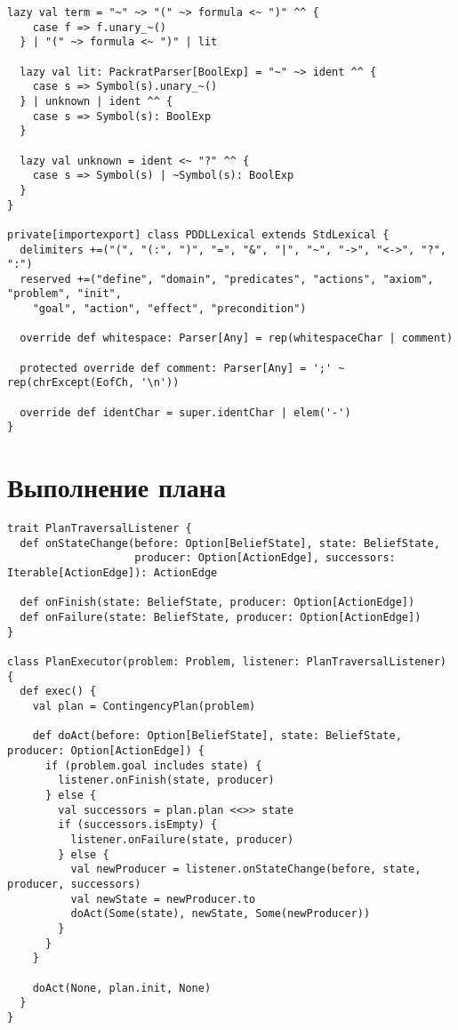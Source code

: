 \begin{lstlisting}[caption=PDDLParser, label=source_parser]
  lazy val term = "~" ~> "(" ~> formula <~ ")" ^^ {
    case f => f.unary_~()
  } | "(" ~> formula <~ ")" | lit

  lazy val lit: PackratParser[BoolExp] = "~" ~> ident ^^ {
    case s => Symbol(s).unary_~()
  } | unknown | ident ^^ {
    case s => Symbol(s): BoolExp
  }

  lazy val unknown = ident <~ "?" ^^ {
    case s => Symbol(s) | ~Symbol(s): BoolExp
  }
}

private[importexport] class PDDLLexical extends StdLexical {
  delimiters +=("(", "(:", ")", "=", "&", "|", "~", "->", "<->", "?", ":")
  reserved +=("define", "domain", "predicates", "actions", "axiom", "problem", "init",
    "goal", "action", "effect", "precondition")

  override def whitespace: Parser[Any] = rep(whitespaceChar | comment)

  protected override def comment: Parser[Any] = ';' ~ rep(chrExcept(EofCh, '\n'))

  override def identChar = super.identChar | elem('-')
}
\end{lstlisting}

\section*{Выполнение плана}
\begin{lstlisting}[caption=PlanExecutor, label=source_executor]
 trait PlanTraversalListener {
  def onStateChange(before: Option[BeliefState], state: BeliefState,
                    producer: Option[ActionEdge], successors: Iterable[ActionEdge]): ActionEdge

  def onFinish(state: BeliefState, producer: Option[ActionEdge])
  def onFailure(state: BeliefState, producer: Option[ActionEdge])
}

class PlanExecutor(problem: Problem, listener: PlanTraversalListener) {
  def exec() {
    val plan = ContingencyPlan(problem)

    def doAct(before: Option[BeliefState], state: BeliefState, producer: Option[ActionEdge]) {
      if (problem.goal includes state) {
        listener.onFinish(state, producer)
      } else {
        val successors = plan.plan <<>> state
        if (successors.isEmpty) {
          listener.onFailure(state, producer)
        } else {
          val newProducer = listener.onStateChange(before, state, producer, successors)
          val newState = newProducer.to
          doAct(Some(state), newState, Some(newProducer))
        }
      }
    }

    doAct(None, plan.init, None)
  }
}
\end{lstlisting}
